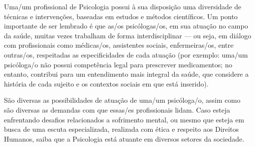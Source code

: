 \documentclass[a5paper, twoside, symmetric, nohyper]{tufte-book}
\begin{document}
Uma/um profissional de Psicologia possui à sua disposição uma
diversidade de técnicas e intervenções, baseadas em estudos e métodos
científicos. Um ponto importante de ser lembrado é que as/os
psicólogas/os, em sua atuação no campo da saúde, muitas vezes trabalham
de forma interdisciplinar --- ou seja, em diálogo com profissionais como
médicas/os, assistentes sociais, enfermeiras/os, entre outras/os,
respeitadas as especificidades de cada atuação (por exemplo: uma/um
psicóloga/o não possui competência legal para prescrever medicamentos;
no entanto, contribui para um entendimento mais integral da saúde, que
considere a história de cada sujeito e os contextos sociais em que está
inserido).

São diversas as possibilidades de atuação de uma/um psicóloga/o, assim
como são diversas as demandas com que essas/es profissionais lidam. Caso
esteja enfrentando desafios relacionados a sofrimento mental, ou mesmo
que esteja em busca de uma escuta especializada, realizada com ética e
respeito aos Direitos Humanos, saiba que a Psicologia está atuante em
diversos setores da sociedade.
\end{document}
